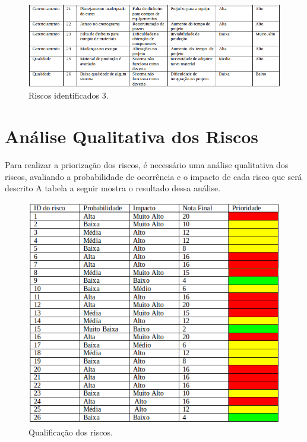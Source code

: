 	\begin{figure}[H]
		\centering
		\includegraphics[scale=0.6]{figuras/riscos3.png}
		\caption{Riscos identificados 3.}
		\label{img:risco3}
	\end{figure}
	

\section{Análise Qualitativa dos Riscos} %
\label{sec:análise_qualitativa_dos_riscos}

	Para realizar a priorização dos riscos, é necessário uma análise qualitativa dos riscos, avaliando a probabilidade de ocorrência e o impacto de cada risco que será descrito A tabela a seguir mostra o resultado dessa análise.

	\begin{figure}[H]
		\centering
		\includegraphics[scale=0.8]{figuras/riscosQualitativo.png}
		\caption{Qualificação dos riscos.}
		\label{img:ear}
	\end{figure}

